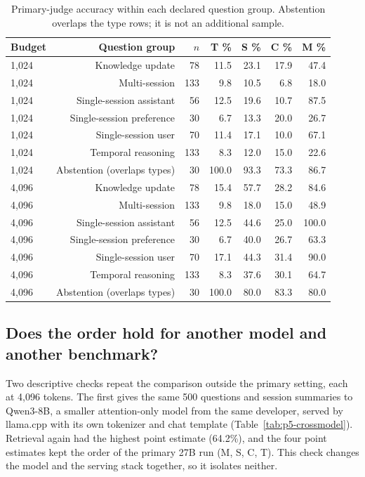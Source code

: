 {\begin{table}[htbp]\centering\small\setlength{\tabcolsep}{4pt}
\begin{tabular}{lrrrrrr}\toprule
Budget & Question group & $n$ & T \% & S \% & C \% & M \%\\ \midrule
1,024 & Knowledge update & 78 & 11.5 & 23.1 & 17.9 & 47.4\\
1,024 & Multi-session & 133 & 9.8 & 10.5 & 6.8 & 18.0\\
1,024 & Single-session assistant & 56 & 12.5 & 19.6 & 10.7 & 87.5\\
1,024 & Single-session preference & 30 & 6.7 & 13.3 & 20.0 & 26.7\\
1,024 & Single-session user & 70 & 11.4 & 17.1 & 10.0 & 67.1\\
1,024 & Temporal reasoning & 133 & 8.3 & 12.0 & 15.0 & 22.6\\
1,024 & Abstention (overlaps types) & 30 & 100.0 & 93.3 & 73.3 & 86.7\\
4,096 & Knowledge update & 78 & 15.4 & 57.7 & 28.2 & 84.6\\
4,096 & Multi-session & 133 & 9.8 & 18.0 & 15.0 & 48.9\\
4,096 & Single-session assistant & 56 & 12.5 & 44.6 & 25.0 & 100.0\\
4,096 & Single-session preference & 30 & 6.7 & 40.0 & 26.7 & 63.3\\
4,096 & Single-session user & 70 & 17.1 & 44.3 & 31.4 & 90.0\\
4,096 & Temporal reasoning & 133 & 8.3 & 37.6 & 30.1 & 64.7\\
4,096 & Abstention (overlaps types) & 30 & 100.0 & 80.0 & 83.3 & 80.0\\
\bottomrule\end{tabular}
\caption{Primary-judge accuracy within each declared question group. Abstention overlaps the type rows; it is not an additional sample.}\label{tab:p5-subgroups}
\end{table}
\subsection{Does the order hold for another model and another benchmark?}\label{sec:transfer}
Two descriptive checks repeat the comparison outside the primary setting, each at 4,096 tokens. The first gives the same 500 questions and session summaries to Qwen3-8B, a smaller attention-only model from the same developer, served by llama.cpp with its own tokenizer and chat template (Table~\ref{tab:p5-crossmodel}). Retrieval again had the highest point estimate (64.2\%), and the four point estimates kept the order of the primary 27B run (M, S, C, T). This check changes the model and the serving stack together, so it isolates neither.

}
